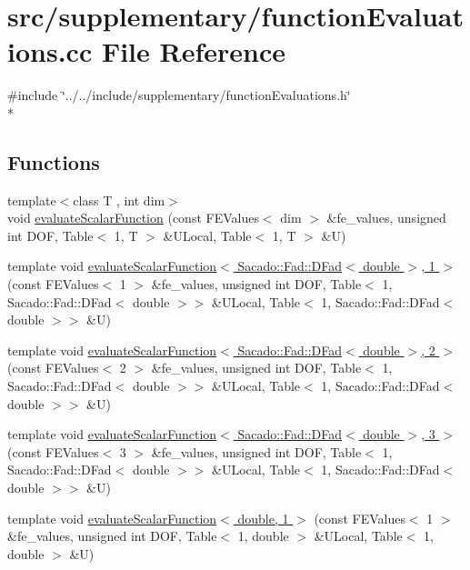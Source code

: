 \section{src/supplementary/function\-Evaluations.cc File Reference}
\label{function_evaluations_8cc}
{\ttfamily \#include \char`\"{}../../include/supplementary/function\-Evaluations.\-h\char`\"{}}\\*
\subsection*{Functions}
\begin{DoxyCompactItemize}
\item 
{\footnotesize template$<$class T , int dim$>$ }\\void \hyperlink{group___evaluation_functions_ga399ae2353249293211c021848a64175c}{evaluate\-Scalar\-Function} (const F\-E\-Values$<$ dim $>$ \&fe\-\_\-values, unsigned int D\-O\-F, Table$<$ 1, T $>$ \&U\-Local, Table$<$ 1, T $>$ \&U)
\item 
template void \hyperlink{function_evaluations_8cc_a6856c1b1b83231bc778cecda3950533d}{evaluate\-Scalar\-Function$<$ Sacado\-::\-Fad\-::\-D\-Fad$<$ double $>$, 1 $>$} (const F\-E\-Values$<$ 1 $>$ \&fe\-\_\-values, unsigned int D\-O\-F, Table$<$ 1, Sacado\-::\-Fad\-::\-D\-Fad$<$ double $>$$>$ \&U\-Local, Table$<$ 1, Sacado\-::\-Fad\-::\-D\-Fad$<$ double $>$$>$ \&U)
\item 
template void \hyperlink{function_evaluations_8cc_af8ed01aa7f3c36625c149e3600d96714}{evaluate\-Scalar\-Function$<$ Sacado\-::\-Fad\-::\-D\-Fad$<$ double $>$, 2 $>$} (const F\-E\-Values$<$ 2 $>$ \&fe\-\_\-values, unsigned int D\-O\-F, Table$<$ 1, Sacado\-::\-Fad\-::\-D\-Fad$<$ double $>$$>$ \&U\-Local, Table$<$ 1, Sacado\-::\-Fad\-::\-D\-Fad$<$ double $>$$>$ \&U)
\item 
template void \hyperlink{function_evaluations_8cc_a57853d187be6c5f0a186e6ba62f141d6}{evaluate\-Scalar\-Function$<$ Sacado\-::\-Fad\-::\-D\-Fad$<$ double $>$, 3 $>$} (const F\-E\-Values$<$ 3 $>$ \&fe\-\_\-values, unsigned int D\-O\-F, Table$<$ 1, Sacado\-::\-Fad\-::\-D\-Fad$<$ double $>$$>$ \&U\-Local, Table$<$ 1, Sacado\-::\-Fad\-::\-D\-Fad$<$ double $>$$>$ \&U)
\item 
template void \hyperlink{function_evaluations_8cc_a436a979f117d9baba72821197a739e19}{evaluate\-Scalar\-Function$<$ double, 1 $>$} (const F\-E\-Values$<$ 1 $>$ \&fe\-\_\-values, unsigned int D\-O\-F, Table$<$ 1, double $>$ \&U\-Local, Table$<$ 1, double $>$ \&U)

\end{DoxyCompactItemize}
